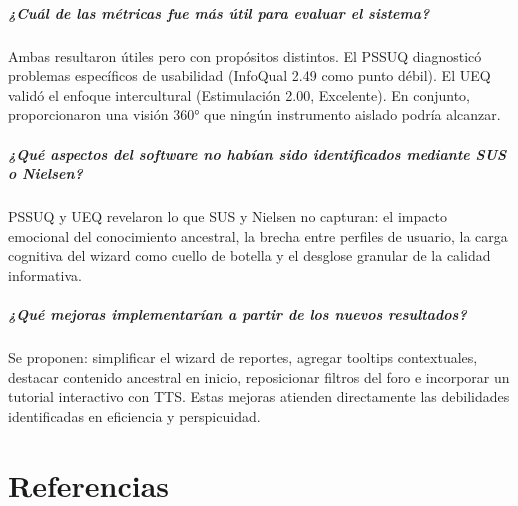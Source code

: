 \documentclass[a4paper,12pt]{report}
\begin{document}
\paragraph{¿Cuál de las métricas fue más útil para evaluar el sistema?}
Ambas resultaron útiles pero con propósitos distintos. El PSSUQ diagnosticó problemas específicos de usabilidad (InfoQual 2.49 como punto débil). El UEQ validó el enfoque intercultural (Estimulación 2.00, Excelente). En conjunto, proporcionaron una visión 360° que ningún instrumento aislado podría alcanzar.

\paragraph{¿Qué aspectos del software no habían sido identificados mediante SUS o Nielsen?}
PSSUQ y UEQ revelaron lo que SUS y Nielsen no capturan: el impacto emocional del conocimiento ancestral, la brecha entre perfiles de usuario, la carga cognitiva del wizard como cuello de botella y el desglose granular de la calidad informativa.

\paragraph{¿Qué mejoras implementarían a partir de los nuevos resultados?}
Se proponen: simplificar el wizard de reportes, agregar tooltips contextuales, destacar contenido ancestral en inicio, reposicionar filtros del foro e incorporar un tutorial interactivo con TTS. Estas mejoras atienden directamente las debilidades identificadas en eficiencia y perspicuidad.

\newpage

\chapter*{Referencias}
\end{document}
